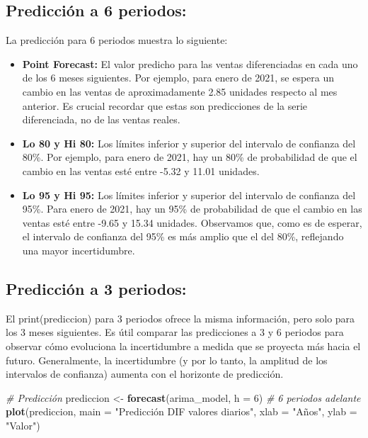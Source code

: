 \documentclass[
]{book}
\newenvironment{Shaded}{\begin{snugshade}}{\end{snugshade}}
\newcommand{\AttributeTok}[1]{\textcolor[rgb]{0.13,0.29,0.53}{#1}}
\newcommand{\CommentTok}[1]{\textcolor[rgb]{0.56,0.35,0.01}{\textit{#1}}}
\newcommand{\DecValTok}[1]{\textcolor[rgb]{0.00,0.00,0.81}{#1}}
\newcommand{\FunctionTok}[1]{\textcolor[rgb]{0.13,0.29,0.53}{\textbf{#1}}}
\newcommand{\NormalTok}[1]{#1}
\newcommand{\OtherTok}[1]{\textcolor[rgb]{0.56,0.35,0.01}{#1}}
\newcommand{\StringTok}[1]{\textcolor[rgb]{0.31,0.60,0.02}{#1}}
\begin{document}
\subsection{Predicción a 6 periodos:}\label{predicciuxf3n-a-6-periodos}

La predicción para 6 periodos muestra lo siguiente:

\begin{itemize}
\item
  \textbf{Point Forecast:} El valor predicho para las ventas diferenciadas en cada uno de los 6 meses siguientes. Por ejemplo, para enero de 2021, se espera un cambio en las ventas de aproximadamente 2.85 unidades respecto al mes anterior. Es crucial recordar que estas son predicciones de la serie diferenciada, no de las ventas reales.
\item
  \textbf{Lo 80 y Hi 80:} Los límites inferior y superior del intervalo de confianza del 80\%. Por ejemplo, para enero de 2021, hay un 80\% de probabilidad de que el cambio en las ventas esté entre -5.32 y 11.01 unidades.
\item
  \textbf{Lo 95 y Hi 95:} Los límites inferior y superior del intervalo de confianza del 95\%. Para enero de 2021, hay un 95\% de probabilidad de que el cambio en las ventas esté entre -9.65 y 15.34 unidades. Observamos que, como es de esperar, el intervalo de confianza del 95\% es más amplio que el del 80\%, reflejando una mayor incertidumbre.
\end{itemize}

\subsection{Predicción a 3 periodos:}\label{predicciuxf3n-a-3-periodos}

El print(prediccion) para 3 periodos ofrece la misma información, pero solo para los 3 meses siguientes. Es útil comparar las predicciones a 3 y 6 periodos para observar cómo evoluciona la incertidumbre a medida que se proyecta más hacia el futuro. Generalmente, la incertidumbre (y por lo tanto, la amplitud de los intervalos de confianza) aumenta con el horizonte de predicción.

\begin{Shaded}
\begin{Highlighting}[]
\CommentTok{\# Predicción}
\NormalTok{prediccion }\OtherTok{\textless{}{-}} \FunctionTok{forecast}\NormalTok{(arima\_model, }\AttributeTok{h =} \DecValTok{6}\NormalTok{) }\CommentTok{\# 6 periodos adelante}
\FunctionTok{plot}\NormalTok{(prediccion, }\AttributeTok{main =} \StringTok{"Predicción DIF valores diarios"}\NormalTok{, }\AttributeTok{xlab =} \StringTok{"Años"}\NormalTok{, }\AttributeTok{ylab =} \StringTok{"Valor"}\NormalTok{)}
\end{Highlighting}
\end{Shaded}
\end{document}
